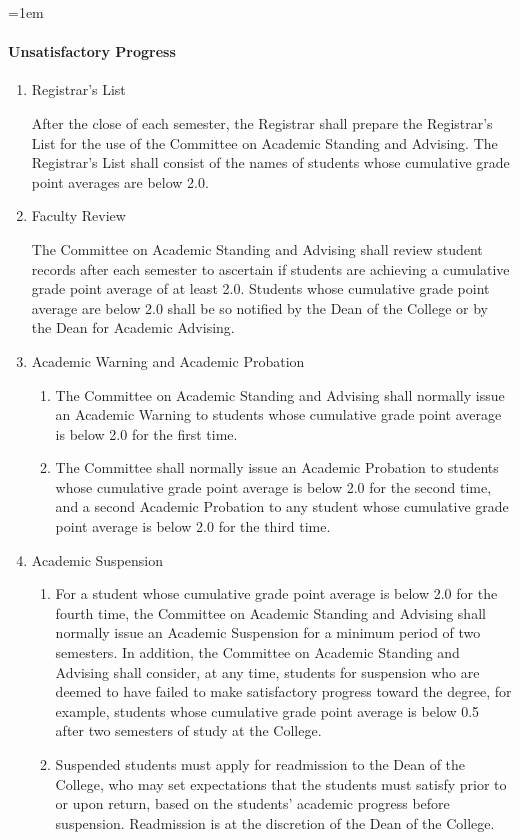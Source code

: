 \documentclass{manual}
\let\oldparagraph\paragraph
\renewcommand\paragraph{\leftskip=1em\oldparagraph}
\newcommand{\itemLevelA}{\alph*.}
\newcommand{\itemLevelB}{\arabic*)}
\newcommand{\itemRefA}{\alph*}
\newcommand{\itemRefB}{\arabic*}
\begin{document}
\paragraph{Unsatisfactory Progress}\label{par:UnsatisfactoryProgress}

	\begin{enumerate}[label=\itemLevelA,ref=\itemRefA]
	\item Registrar's List 

		After the close of each semester, the Registrar shall prepare the Registrar's List for the use of the        Committee on Academic Standing and Advising. The Registrar's List shall consist of the names of        students whose cumulative grade point averages are below 2.0.
	
	\item Faculty Review         

		The Committee on Academic Standing and Advising shall review student records after each semester to ascertain if students are achieving a cumulative grade point average of at least 2.0. Students whose cumulative grade point average are below 2.0 shall be so notified by the Dean of the College or by the Dean for Academic Advising.
	
	\item Academic Warning and Academic Probation        

		\begin{enumerate}[label=\itemLevelB,ref=\itemRefB]
		\item The Committee on Academic Standing and Advising shall normally issue an Academic Warning to students whose cumulative grade point average is below 2.0 for the first time. 
		\item The Committee shall normally issue an Academic Probation to students whose cumulative grade point average is below 2.0 for the second time, and a second Academic Probation to any student whose cumulative grade point average is below 2.0 for the third time. 
		\end{enumerate}
	
	\item Academic Suspension

		\begin{enumerate}[label=\itemLevelB,ref=\itemRefB]
		\item For a student whose cumulative grade point average is below 2.0 for the fourth time, the Committee on Academic Standing and Advising shall normally issue an Academic Suspension for a minimum period of two semesters. In addition, the Committee on Academic Standing and Advising shall consider, at any time, students for suspension who are deemed to have failed to make satisfactory progress toward the degree, for example, students whose cumulative grade point average is below 0.5 after two semesters of study at the College. 
		\item Suspended students must apply for readmission to the Dean of the College, who may set expectations that the students must satisfy prior to or upon return, based on the students' academic progress before suspension. Readmission is at the discretion of the Dean of the College.
		\end{enumerate}
	

\end{enumerate}
\end{document}
